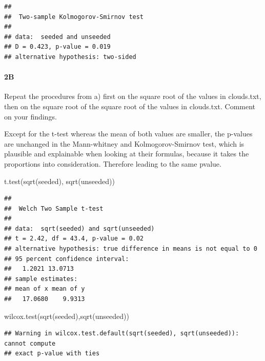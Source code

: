 \documentclass[
]{article}
\newenvironment{Shaded}{\begin{snugshade}}{\end{snugshade}}
\newcommand{\FunctionTok}[1]{\textcolor[rgb]{0.00,0.00,0.00}{#1}}
\newcommand{\NormalTok}[1]{#1}
\begin{document}
\begin{verbatim}
## 
##  Two-sample Kolmogorov-Smirnov test
## 
## data:  seeded and unseeded
## D = 0.423, p-value = 0.019
## alternative hypothesis: two-sided
\end{verbatim}

\hypertarget{b-1}{%
\paragraph{\texorpdfstring{\textbf{2B}}{2B}}\label{b-1}}

Repeat the procedures from a) first on the square root of the values in
clouds.txt, then on the square root of the square root of the values in
clouds.txt. Comment on your findings.

Except for the t-test whereas the mean of both values are smaller, the
p-values are unchanged in the Mann-whitney and Kolmogorov-Smirnov test,
which is plausible and explainable when looking at their formulas,
because it takes the proportions into consideration. Therefore leading
to the same pvalue.

\begin{Shaded}
\begin{Highlighting}[]
\FunctionTok{t.test}\NormalTok{(}\FunctionTok{sqrt}\NormalTok{(seeded), }\FunctionTok{sqrt}\NormalTok{(unseeded))}
\end{Highlighting}
\end{Shaded}

\begin{verbatim}
## 
##  Welch Two Sample t-test
## 
## data:  sqrt(seeded) and sqrt(unseeded)
## t = 2.42, df = 43.4, p-value = 0.02
## alternative hypothesis: true difference in means is not equal to 0
## 95 percent confidence interval:
##   1.2021 13.0713
## sample estimates:
## mean of x mean of y 
##   17.0680    9.9313
\end{verbatim}

\begin{Shaded}
\begin{Highlighting}[]
\FunctionTok{wilcox.test}\NormalTok{(}\FunctionTok{sqrt}\NormalTok{(seeded),}\FunctionTok{sqrt}\NormalTok{(unseeded))}
\end{Highlighting}
\end{Shaded}

\begin{verbatim}
## Warning in wilcox.test.default(sqrt(seeded), sqrt(unseeded)): cannot compute
## exact p-value with ties
\end{verbatim}
\end{document}
